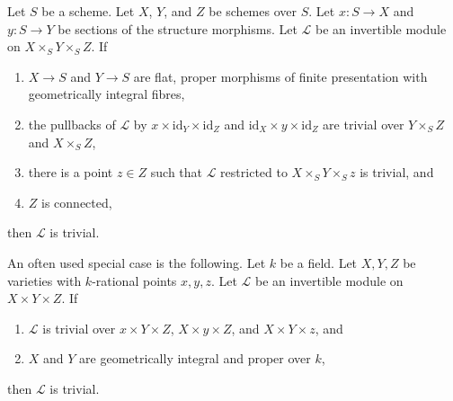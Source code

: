 \begin{theorem}
\label{theorem-of-the-cube}
Let $S$ be a scheme. Let $X$, $Y$, and $Z$ be schemes over $S$.
Let $x : S \to X$ and $y : S \to Y$ be sections of the structure morphisms.
Let $\mathcal{L}$ be an invertible module on $X \times_S Y \times_S Z$. If
\begin{enumerate}
\item $X \to S$ and $Y \to S$ are flat, proper morphisms
of finite presentation with geometrically integral fibres,
\item the pullbacks of $\mathcal{L}$ by
$x \times \text{id}_Y \times \text{id}_Z$ and
$\text{id}_X \times y \times \text{id}_Z$
are trivial over $Y \times_S Z$ and $X \times_S Z$,
\item there is a point $z \in Z$ such that $\mathcal{L}$
restricted to $X \times_S Y \times_S z$ is trivial, and
\item $Z$ is connected,
\end{enumerate}
then $\mathcal{L}$ is trivial.
\end{theorem}

\noindent
An often used special case is the following.
Let $k$ be a field. Let $X, Y, Z$ be varieties with
$k$-rational points $x, y, z$. Let $\mathcal{L}$ be an invertible
module on $X \times Y \times Z$. If
\begin{enumerate}
\item $\mathcal{L}$ is trivial over
$x \times Y \times Z$, $X \times y \times Z$, and $X \times Y \times z$, and
\item $X$ and $Y$ are geometrically integral and proper over $k$,
\end{enumerate}
then $\mathcal{L}$ is trivial.


